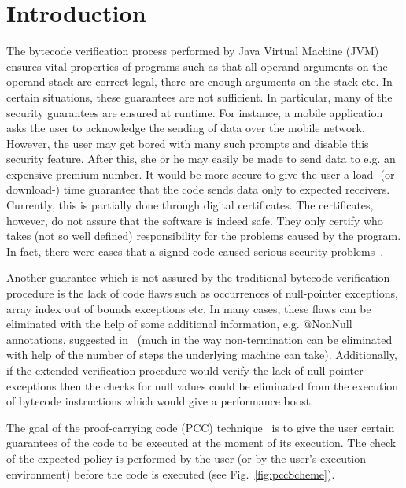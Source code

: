 \documentclass{llncs}
\begin{document}



\section{Introduction}

The bytecode verification process performed by Java Virtual Machine
(JVM) ensures vital properties of programs such as that all operand
arguments on the operand stack are correct legal, there are enough
arguments on the stack etc.  In certain situations, these guarantees
are not sufficient. In particular, many of the security guarantees are
ensured at runtime. For instance, a mobile application asks the user
to acknowledge the sending of data over the mobile network. However,
the user may get bored with many such prompts and disable this
security feature. After this, she or he may easily be made to send
data to e.g. an expensive premium number. It would be more secure to
give the user a load- (or download-) time guarantee that the code
sends data only to expected receivers.  Currently, this is partially
done through digital certificates. The certificates, however, do not
assure that the software is indeed safe. They only certify who takes
(not so well defined) responsibility for the problems caused by the
program.  In fact, there were cases that a signed code caused serious
security problems~\cite{BMGcase}.

Another guarantee which is not assured by the traditional bytecode
verification procedure is the lack of code flaws such as occurrences
of null-pointer exceptions, array index out of bounds exceptions
etc. In many cases, these flaws can be eliminated with the help of
some additional information, e.g. @NonNull annotations, suggested
in~\cite{JSR305} (much in the way non-termination can be eliminated
with help of the number of steps the underlying machine can
take). Additionally, if the extended verification procedure would
verify the lack of null-pointer exceptions then the checks for null
values could be eliminated from the execution of bytecode instructions
which would give a performance boost.

The goal of the proof-carrying code (PCC)
technique~\cite{pcc,PCCForJava} is to give the user certain guarantees of the
code to be executed at the moment of its execution. The check of the expected policy is performed by the user (or by the user's execution environment) before the code is executed (see
Fig.~\ref{fig:pccScheme}).
\end{document}
